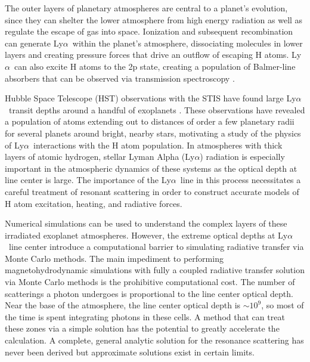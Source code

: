 \documentclass{aastex63}
\newcommand\lya{Ly$\alpha$\ }
\begin{document}
The outer layers of planetary atmospheres are central to a planet's evolution, since they can shelter the lower atmosphere from high energy radiation as well as regulate the escape of gas into space. Ionization and subsequent recombination can generate \lya within the planet's atmosphere, dissociating molecules in lower layers and creating pressure forces that drive an outflow of escaping H atoms. \lya can also excite H atoms to the 2p state, creating a population of Balmer-line absorbers that can be observed via transmission spectroscopy \citep{2017ApJ...851..150H}.

Hubble Space Telescope (HST) observations with the STIS have found large \lya transit depths around a handful of exoplanets \citep{2003Natur.422..143V, 2012A&A...543L...4L, 2012A&A...547A..18E, 2015Natur.522..459E,  2017A&A...597A..26B, 2017A&A...599L...3B, 2017A&A...602A.106B, 2018A&A...620A.147B, 2019AJ....158...50W, 2019EPSC...13.1928L, 2020ApJ...888L..21G,2021arXiv210309864B}. These observations have revealed a population of atoms extending out to distances of order a few planetary radii for several planets around bright, nearby stars, motivating a study of the physics of \lya interactions with the H atom population. In atmospheres with thick layers of atomic hydrogen, stellar Lyman Alpha (Ly$\alpha$) radiation is especially important in the atmospheric dynamics of these systems as the optical depth at line center is large. The importance of the \lya line in this process necessitates a careful treatment of resonant scattering in order to construct accurate models of H atom excitation, heating, and radiative forces. 

Numerical simulations can be used to understand the complex layers of these irradiated exoplanet atmospheres. However, the extreme optical depths at \lya line center introduce a computational barrier to simulating radiative transfer via Monte Carlo methods. The main impediment to performing magnetohydrodynamic simulations with fully a coupled radiative transfer solution via Monte Carlo methods is the prohibitive computational cost. The number of scatterings a photon undergoes is proportional to the line center optical depth.  Near the base of the atmosphere, the line center optical depth is ${\sim}10^9$, so most of the time is spent integrating photons in these cells. A method that can treat these zones via a simple solution has the potential to greatly accelerate the calculation. A complete, general analytic solution for the resonance scattering has never been derived but approximate solutions exist in certain limits.
\end{document}
